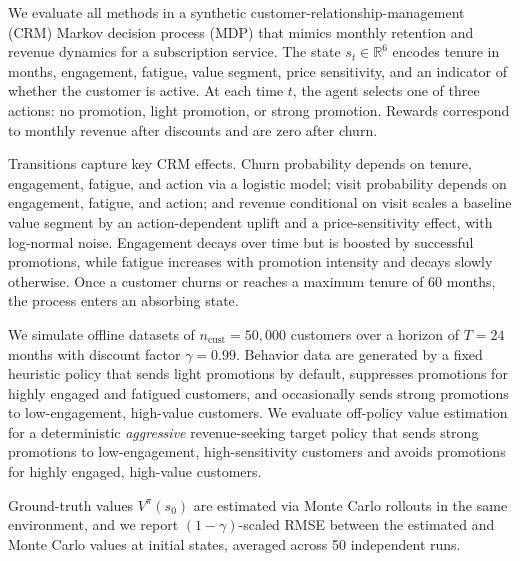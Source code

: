 \documentclass{article}
\theoremstyle{plain}
\theoremstyle{definition}
\theoremstyle{remark}
\begin{document}
We evaluate all methods in a synthetic customer-relationship-management (CRM)
Markov decision process (MDP) that mimics monthly retention and revenue dynamics
for a subscription service. The state $s_t \in \mathbb{R}^6$ encodes tenure in
months, engagement, fatigue, value segment, price sensitivity, and an indicator
of whether the customer is active. At each time $t$, the agent selects one of
three actions: no promotion, light promotion, or strong promotion. Rewards
correspond to monthly revenue after discounts and are zero after churn.

Transitions capture key CRM effects. Churn probability depends on tenure,
engagement, fatigue, and action via a logistic model; visit probability depends
on engagement, fatigue, and action; and revenue conditional on visit scales a
baseline value segment by an action-dependent uplift and a price-sensitivity
effect, with log-normal noise. Engagement decays over time but is boosted by
successful promotions, while fatigue increases with promotion intensity and
decays slowly otherwise. Once a customer churns or reaches a maximum tenure of
60 months, the process enters an absorbing state.

We simulate offline datasets of $n_{\text{cust}} = 50{,}000$ customers over a
horizon of $T = 24$ months with discount factor $\gamma = 0.99$. Behavior data are
generated by a fixed heuristic policy that sends light promotions by default,
suppresses promotions for highly engaged and fatigued customers, and
occasionally sends strong promotions to low-engagement, high-value customers. We
evaluate off-policy value estimation for a deterministic \emph{aggressive}
revenue-seeking target policy that sends strong promotions to low-engagement,
high-sensitivity customers and avoids promotions for highly engaged, high-value
customers.

Ground-truth values $V^\pi(s_0)$ are estimated via Monte Carlo rollouts in the
same environment, and we report $(1-\gamma)$-scaled RMSE between the estimated and
Monte Carlo values at initial states, averaged across 50 independent runs.
\end{document}
